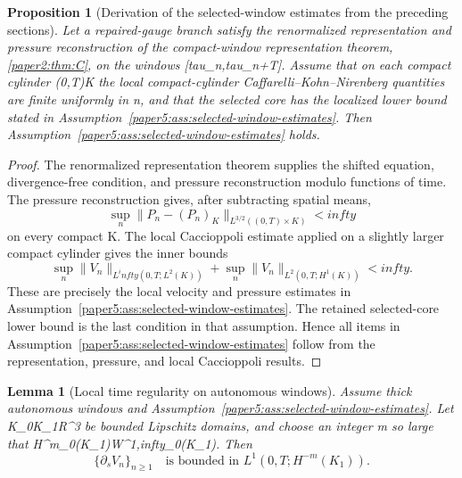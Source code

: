\documentclass[11pt]{amsart}
\def\({}%
\def\){}%
\def\mathbb#1{#1}%
\def\tau{tau}%
\def\infty{infty}%
\theoremstyle{plain}
\newtheorem{lemma}[theorem]{Lemma}
\newtheorem{proposition}[theorem]{Proposition}
\theoremstyle{definition}
\theoremstyle{remark}
\begin{document}
\begin{proposition}[Derivation of the selected-window estimates from the preceding sections]
\label{paper5:prop:selected-window-derived}
Let a repaired-gauge branch satisfy the renormalized representation and pressure reconstruction
of the compact-window representation theorem, \cref{paper2:thm:C}, on the windows \([\tau_n,\tau_n+T]\).  Assume that on
each compact cylinder \((0,T)\times K\) the local compact-cylinder Caffarelli--Kohn--Nirenberg
quantities are finite uniformly in \(n\), and that the selected core has the localized lower
bound stated in Assumption~\ref{paper5:ass:selected-window-estimates}.  Then
Assumption~\ref{paper5:ass:selected-window-estimates} holds.
\end{proposition}

\begin{proof}
The renormalized representation theorem supplies the shifted equation, divergence-free condition,
and pressure reconstruction modulo functions of time.  The pressure reconstruction gives, after
subtracting spatial means,
\[
  \sup_n\|P_n-(P_n)_K\|_{L^{3/2}((0,T)\times K)}<\infty
\]
on every compact \(K\).  The local Caccioppoli estimate applied on a slightly larger compact
cylinder gives the inner bounds
\[
  \sup_n\|V_n\|_{L^\infty(0,T;L^2(K))}
  +\sup_n\|V_n\|_{L^2(0,T;H^1(K))}<\infty.
\]
These are precisely the local velocity and pressure estimates in
Assumption~\ref{paper5:ass:selected-window-estimates}.  The retained selected-core lower bound is the
last condition in that assumption.  Hence all items in
Assumption~\ref{paper5:ass:selected-window-estimates} follow from the representation,
pressure, and local Caccioppoli results.
\end{proof}

\begin{lemma}[Local time regularity on autonomous windows]\label{paper5:lem:window-time-regularity}
Assume thick autonomous windows and Assumption~\ref{paper5:ass:selected-window-estimates}.  Let
\(K_0\Subset K_1\Subset\mathbb R^3\) be bounded Lipschitz domains, and choose an integer
\(m\) so large that \(H^m_0(K_1)\hookrightarrow W^{1,\infty}_0(K_1)\).  Then
\[
  \{\partial_sV_n\}_{n\ge1}
  \quad\text{is bounded in }L^1(0,T;H^{-m}(K_1)).
\]
\end{lemma}
\end{document}
